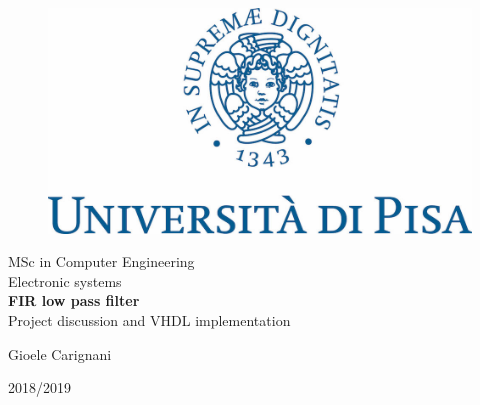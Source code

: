
\begin{titlepage}

    \begin{figure}
      \centering
      \includegraphics[scale=0.3]{images/cherubino.jpeg}
    \end{figure}

    \begin{center}
      MSc in Computer Engineering\\
      Electronic systems\\
      \vspace*{5\baselineskip}
      \textbf{\large FIR low pass filter}\\
      Project discussion and VHDL implementation
    \end{center}
    \vspace*{7\baselineskip}
    \null\hfill Gioele Carignani

    \begin{center}
        2018/2019
    \end{center}
\end{titlepage}